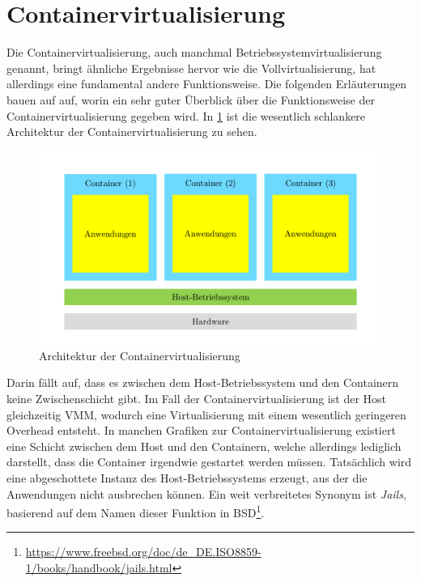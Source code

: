 \section{Containervirtualisierung}
\label{sec:containervirtualisierung}
Die Containervirtualisierung, auch manchmal Betriebssystemvirtualisierung genannt, bringt ähnliche Ergebnisse hervor wie die Vollvirtualisierung, hat allerdings eine fundamental andere Funktionsweise.
Die folgenden Erläuterungen bauen auf \autocite{EntwicklerDE2015} auf, worin ein sehr guter Überblick über die Funktionsweise der Containervirtualisierung gegeben wird.
In \cref{fig:architektur-containervirtualisierung} ist die wesentlich schlankere Architektur der Containervirtualisierung zu sehen.
\begin{figure}[htbp]
    \centering
    \includegraphics[width=0.9\linewidth,clip]{images/containervirtualisierung}
    \caption{Architektur der Containervirtualisierung}
    \label{fig:architektur-containervirtualisierung}
\end{figure}
Darin fällt auf, dass es zwischen dem Host-Betriebssystem und den Containern keine Zwischenschicht gibt.
Im Fall der Containervirtualisierung ist der Host gleichzeitig VMM, wodurch eine Virtualisierung mit einem wesentlich geringeren Overhead entsteht.
In manchen Grafiken zur Containervirtualisierung existiert eine Schicht zwischen dem Host und den Containern, welche allerdings lediglich darstellt, dass die Container irgendwie gestartet werden müssen.
Tatsächlich wird eine abgeschottete Instanz des Host-Betriebssystems erzeugt, aus der die Anwendungen nicht ausbrechen können.
Ein weit verbreitetes Synonym ist \emph{Jails}, basierend auf dem Namen dieser Funktion in BSD\footnote{\url{https://www.freebsd.org/doc/de_DE.ISO8859-1/books/handbook/jails.html}}.

